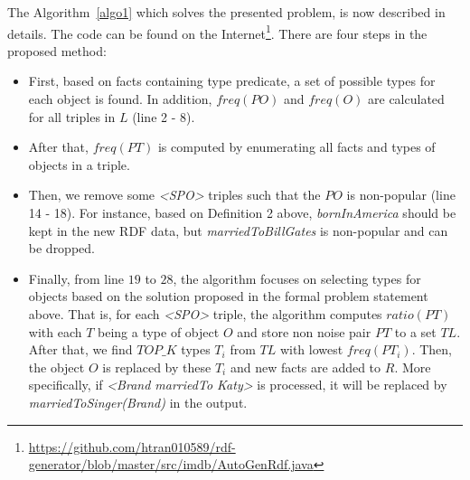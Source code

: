 \documentclass{acm_proc_article-sp}
\begin{document}
The Algorithm~\ref{algo1} which solves the presented problem, is now described in details. The code can be found on the Internet\footnote{\url{https://github.com/htran010589/rdf-generator/blob/master/src/imdb/AutoGenRdf.java}}. There are four steps in the proposed method:
\begin{itemize}
\item First, based on facts containing type predicate, a set of possible types for each object is found. In addition, $freq(PO)$ and $freq(O)$ are calculated for all triples in $L$ (line 2 - 8).
\item After that, $freq(PT)$ is computed by enumerating all facts and types of objects in a triple.
\item Then, we remove some \textit{<SPO>} triples such that the $PO$ is non-popular (line 14 - 18). For instance, based on Definition 2 above, \textit{bornInAmerica} should be kept in the new RDF data, but \textit{marriedToBillGates} is non-popular and can be dropped.
\item Finally, from line $19$ to $28$, the algorithm focuses on selecting types for objects based on the solution proposed in the formal problem statement above. That is, for each \textit{<SPO>} triple, the algorithm computes $ratio(PT)$ with each $T$ being a type of object $O$ and store non noise pair $PT$ to a set $TL$. After that, we find $TOP\_K$ types $T_{i}$ from $TL$ with lowest $freq(PT_{i})$. Then, the object $O$ is replaced by these $T_{i}$ and new facts are added to $R$. More specifically, if \textit{<Brand marriedTo Katy>} is processed, it will be replaced by \textit{marriedToSinger(Brand)} in the output.
\end{itemize}
\end{document}
